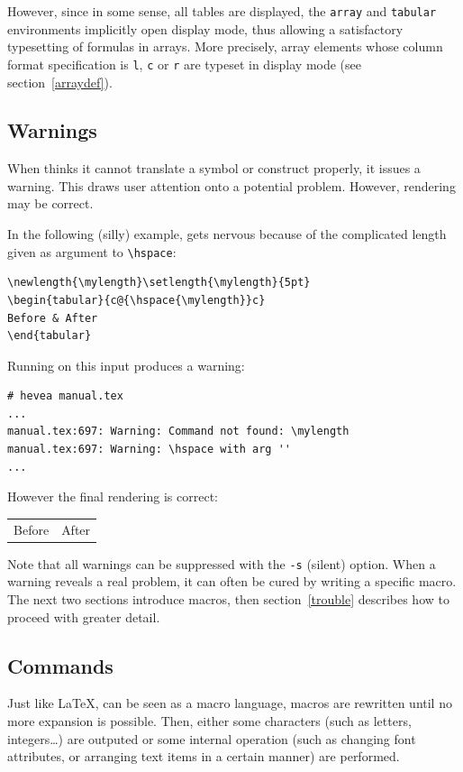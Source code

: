 However, since in some sense, all \html{} tables are displayed, the
\verb+array+ and \verb+tabular+ environments implicitly open display
mode, thus allowing a satisfactory typesetting of formulas in
arrays. More precisely, array elements whose column format
specification is \verb+l+, \verb+c+ or \verb+r+ are typeset in display
mode (see section~\ref{arraydef}).


\subsection{Warnings}
When \hevea{} thinks it cannot translate a symbol or construct
properly, it issues a warning. This draws user attention onto a
potential problem. However, rendering may be correct.

\begin{htmlonly}
In the following (silly) example, \hevea{} gets nervous  because of
the complicated length given as argument to \verb+\hspace+:
\begin{verbatim}
\newlength{\mylength}\setlength{\mylength}{5pt}
\begin{tabular}{c@{\hspace{\mylength}}c}
Before & After
\end{tabular}
\end{verbatim}
Running \hevea{} on this input produces a warning:
\begin{verbatim}
# hevea manual.tex
...
manual.tex:697: Warning: Command not found: \mylength
manual.tex:697: Warning: \hspace with arg ''
...
\end{verbatim}
However the final rendering is correct:
\begin{htmlout}
\newlength{\mylength}\setlength{\mylength}{5pt}%
\begin{tabular}{c@{\hspace{\mylength}}c}
Before & After
\end{tabular}
\end{htmlout}
\end{htmlonly}

Note that all warnings can be suppressed with the \verb+-s+ (silent)
option.
When a warning reveals a real problem, it can often be cured by
writing a specific macro. The next two sections introduce \hevea{}
macros, then section~\ref{trouble} describes how to proceed with
greater detail.

\subsection{Commands}
Just like \LaTeX{}, \hevea{} can be seen as a macro language, macros
are rewritten until no more expansion is possible. Then, either some
characters (such as letters, integers\ldots) are outputed or some
internal operation (such as changing font attributes, or arranging
text items in a certain manner) are performed.

